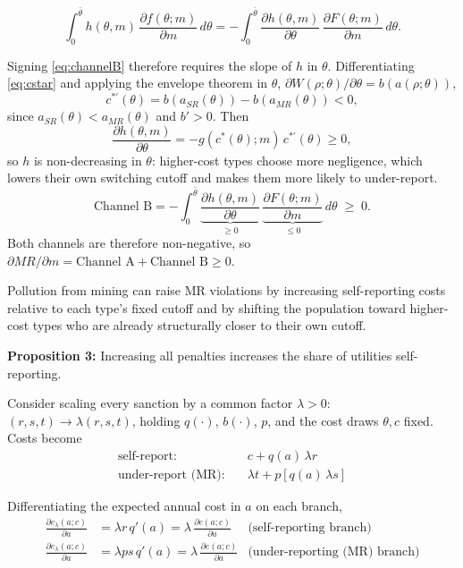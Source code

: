 \documentclass[12pt]{article}
\begin{document}
	\begin{equation}\label{eq:channelB}
		\int_0^{\bar\theta} h(\theta,m)\,\frac{\partial f(\theta;m)}{\partial m}\, d\theta = -\int_0^{\bar\theta} \frac{\partial h(\theta,m)}{\partial\theta}\,\frac{\partial F(\theta;m)}{\partial m}\, d\theta.
	\end{equation}
    
    Signing \eqref{eq:channelB} therefore requires the slope of $h$ in $\theta$. Differentiating \eqref{eq:cstar} and applying the envelope theorem in $\theta$, $\partial W(\rho;\theta)/\partial\theta = b(a(\rho;\theta))$,
	\[
	c^{*\prime}(\theta) = b(a_{SR}(\theta)) - b(a_{MR}(\theta)) < 0,
	\]
	since $a_{SR}(\theta) < a_{MR}(\theta)$ and $b' > 0$. Then
	\[
	\frac{\partial h(\theta,m)}{\partial\theta} = -g(c^*(\theta);m)\,c^{*\prime}(\theta) \ge 0,
	\]
	so $h$ is non-decreasing in $\theta$: higher-cost types choose more negligence, which lowers their own switching cutoff and makes them more likely to under-report.
	\[
	\text{Channel B} = -\int_0^{\bar\theta} \underbrace{\frac{\partial h(\theta,m)}{\partial\theta}}_{\ge 0}\,\underbrace{\frac{\partial F(\theta;m)}{\partial m}}_{\le 0}\, d\theta \;\ge\; 0.
	\]
	Both channels are therefore non-negative, so $\partial MR/\partial m = \text{Channel A} + \text{Channel B} \ge 0$.
    
    Pollution from mining can raise MR violations by increasing self-reporting costs relative to each type's fixed cutoff and by shifting the population toward higher-cost types who are already structurally closer to their own cutoff.

	\textbf{Proposition 3:} Increasing all penalties increases the share of utilities self-reporting.
	
	Consider scaling every sanction by a common factor $\lambda>0$: $(r,s,t) \to \lambda(r,s,t)$, holding $q(\cdot)$, $b(\cdot)$, $p$, and the cost draws $\theta,c$ fixed. Costs become
    \begin{align*}
		\text{self-report:} \quad & c + q(a)\,\lambda r \\
		\text{under-report (MR):} \quad & \lambda t + p\left[q(a)\,\lambda s\right]
	\end{align*}
	
	Differentiating the expected annual cost in $a$ on each branch,
	\begin{align*}
		\frac{\partial e_\lambda(a;c)}{\partial a} &= \lambda r\,q'(a) = \lambda\, \frac{\partial e(a;c)}{\partial a} & \text{(self-reporting branch)} \\
		\frac{\partial e_\lambda(a;c)}{\partial a} &= \lambda ps\,q'(a) = \lambda\, \frac{\partial e(a;c)}{\partial a} & \text{(under-reporting (MR) branch)}
	\end{align*}
	
\end{document}
